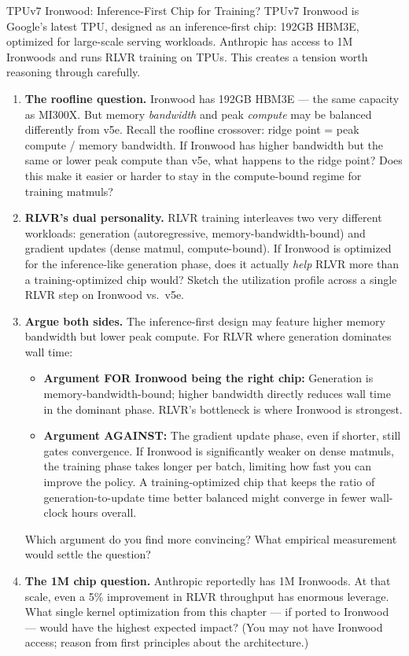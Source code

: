 \begin{thinkfirst}{TPUv7 Ironwood: Inference-First Chip for Training?}
TPUv7 Ironwood is Google's latest TPU, designed as an inference-first chip: 192GB HBM3E, optimized for large-scale serving workloads. Anthropic has access to 1M Ironwoods and runs RLVR training on TPUs. This creates a tension worth reasoning through carefully.

\begin{enumerate}
  \item \textbf{The roofline question.} Ironwood has 192GB HBM3E --- the same capacity as MI300X. But memory \textit{bandwidth} and peak \textit{compute} may be balanced differently from v5e. Recall the roofline crossover: ridge point = peak compute / memory bandwidth. If Ironwood has higher bandwidth but the same or lower peak compute than v5e, what happens to the ridge point? Does this make it easier or harder to stay in the compute-bound regime for training matmuls?

  \item \textbf{RLVR's dual personality.} RLVR training interleaves two very different workloads: generation (autoregressive, memory-bandwidth-bound) and gradient updates (dense matmul, compute-bound). If Ironwood is optimized for the inference-like generation phase, does it actually \textit{help} RLVR more than a training-optimized chip would? Sketch the utilization profile across a single RLVR step on Ironwood vs.\ v5e.

  \item \textbf{Argue both sides.} The inference-first design may feature higher memory bandwidth but lower peak compute. For RLVR where generation dominates wall time:
  \begin{itemize}
    \item \textbf{Argument FOR Ironwood being the right chip:} Generation is memory-bandwidth-bound; higher bandwidth directly reduces wall time in the dominant phase. RLVR's bottleneck is where Ironwood is strongest.
    \item \textbf{Argument AGAINST:} The gradient update phase, even if shorter, still gates convergence. If Ironwood is significantly weaker on dense matmuls, the training phase takes longer per batch, limiting how fast you can improve the policy. A training-optimized chip that keeps the ratio of generation-to-update time better balanced might converge in fewer wall-clock hours overall.
  \end{itemize}
  Which argument do you find more convincing? What empirical measurement would settle the question?

  \item \textbf{The 1M chip question.} Anthropic reportedly has 1M Ironwoods. At that scale, even a 5\% improvement in RLVR throughput has enormous leverage. What single kernel optimization from this chapter --- if ported to Ironwood --- would have the highest expected impact? (You may not have Ironwood access; reason from first principles about the architecture.)
\end{enumerate}
\end{thinkfirst}

